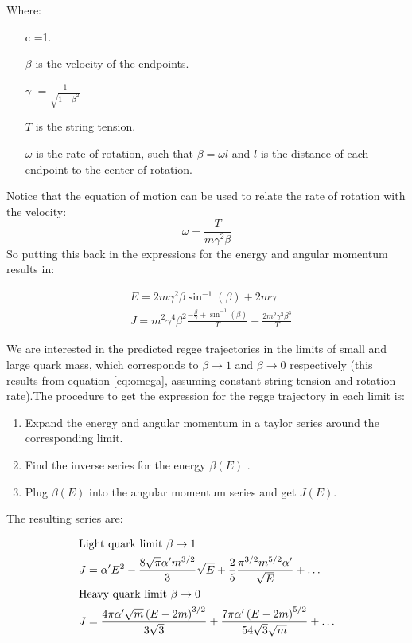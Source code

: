 \documentclass[11pt,a4paper]{article}
\begin{document}
Where:
\begin{itemize}
\item[c]=1.
\item[$\beta$] is the velocity of the endpoints.
\item[$\gamma$]$=\frac{1}{\sqrt{1-\beta^2}}$
\item[$T$] is the string tension.
\item[$\omega$] is the rate of rotation, such that $\beta=\omega l$ and $l$ is the distance of each endpoint to the center of rotation.
\end{itemize}

Notice that the equation of motion can be used to relate the rate of rotation with the velocity:
\begin{equation}
\label{eq:omega}
\omega=\frac{T}{m\gamma^2\beta}
\end{equation}
So putting this back in the expressions for the energy and angular momentum results in:

\begin{subequations}
\begin{align}
&E=2m\gamma^2\beta\sin^{-1}\left(\beta\right)+2m\gamma\\
&J=m^2\gamma^4\beta^2 \frac{-\frac{\beta}{\gamma}+\sin^{-1}\left(\beta\right)}{T}+\frac{2m^2\gamma^3\beta^{3}}{T}
\end{align}
\end{subequations}

We are interested in the predicted regge trajectories in the limits of small and large quark mass, which corresponds to $\beta\rightarrow1$ and $\beta\rightarrow0$ respectively (this results from equation \ref{eq:omega}, assuming constant string tension and rotation rate).The procedure to get the expression for the regge trajectory in each limit  is:
\begin{enumerate}
\item Expand the energy and angular momentum in a taylor series around the corresponding limit.
\item Find the inverse series for the energy $\beta\left(E\right)$ \cite{WolframSeriesReversion}.
\item Plug $\beta\left(E\right)$ into the angular momentum series and get $J\left(E\right)$.
\end{enumerate}

The resulting series are:

\begin{subequations}  
\begin{align}
&\text{Light quark limit }\beta\rightarrow1\notag\\
&J=\alpha' E^2-\frac{8 \sqrt{\pi } \alpha' m^{3/2}}{3}\sqrt{E}+\frac{2}{5}\frac{\pi^{3/2}m^{5/2}\alpha'}{\sqrt{E}}+\hdots \\
&\text{Heavy quark limit }\beta\rightarrow0\notag\\
&J=\frac{4\pi\alpha'\sqrt{m} \left(E-2 m\right)^{3/2}}{3\sqrt{3}}+\frac{7\pi\alpha'  \left(E-2m\right)^{5/2}}{54\sqrt{3}\sqrt{m}}+\hdots
\end{align}
\end{subequations}
\end{document}
